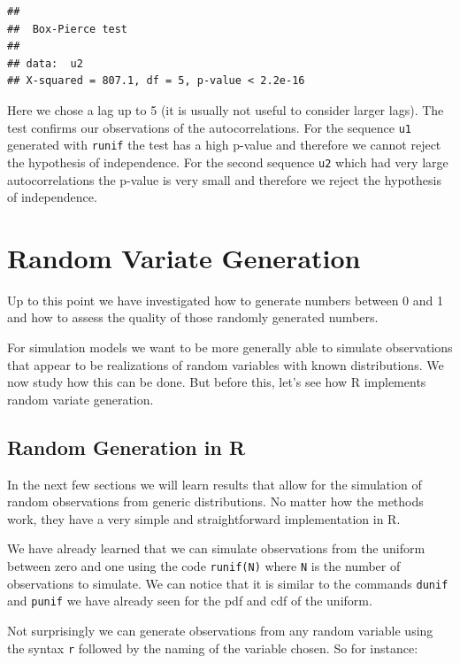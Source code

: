 \documentclass[
]{book}
\theoremstyle{definition}
\theoremstyle{definition}
\theoremstyle{definition}
\theoremstyle{definition}
\theoremstyle{remark}
\begin{document}
\begin{verbatim}
## 
##  Box-Pierce test
## 
## data:  u2
## X-squared = 807.1, df = 5, p-value < 2.2e-16
\end{verbatim}

Here we chose a lag up to 5 (it is usually not useful to consider larger lags). The test confirms our observations of the autocorrelations. For the sequence \texttt{u1} generated with \texttt{runif} the test has a high p-value and therefore we cannot reject the hypothesis of independence. For the second sequence \texttt{u2} which had very large autocorrelations the p-value is very small and therefore we reject the hypothesis of independence.

\hypertarget{random-variate-generation}{%
\section{Random Variate Generation}\label{random-variate-generation}}

Up to this point we have investigated how to generate numbers between 0 and 1 and how to assess the quality of those randomly generated numbers.

For simulation models we want to be more generally able to simulate observations that appear to be realizations of random variables with known distributions. We now study how this can be done. But before this, let's see how R implements random variate generation.

\hypertarget{random-generation-in-r}{%
\subsection{Random Generation in R}\label{random-generation-in-r}}

In the next few sections we will learn results that allow for the simulation of random observations from generic distributions. No matter how the methods work, they have a very simple and straightforward implementation in R.

We have already learned that we can simulate observations from the uniform between zero and one using the code \texttt{runif(N)} where \texttt{N} is the number of observations to simulate. We can notice that it is similar to the commands \texttt{dunif} and \texttt{punif} we have already seen for the pdf and cdf of the uniform.

Not surprisingly we can generate observations from any random variable using the syntax \texttt{r} followed by the naming of the variable chosen. So for instance:
\end{document}
